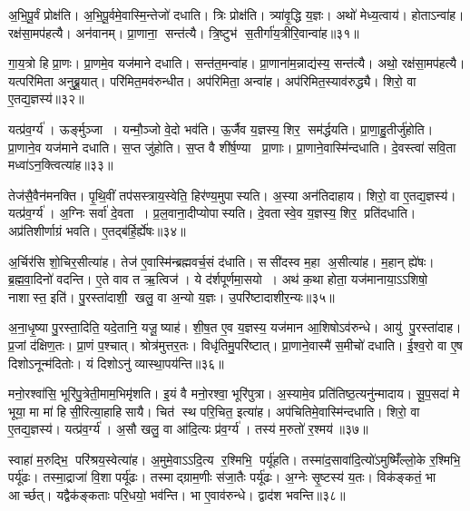 अ॒भि॒पू॒र्वं प्रोक्ष॑ति। 
अ॒भि॒पू॒र्वमे॒वास्मि॒न्तेजो॑ दधाति। 
त्रिः प्रोक्ष॑ति। 
त्र्या॑वृ॒द्धि य॒ज्ञः। 
अथो॑ मेध्य॒त्वाय॑। 
होताऽन्वा॑ह। 
रक्ष॑सा॒मप॑हत्यै। 
अन॑वानम्। 
प्रा॒णाना॒ सन्त॑त्यै। 
त्रि॒ष्टुभ॑ स॒तीर्गा॑य॒त्रीरि॒वान्वा॑ह॥३१॥

गा॒य॒त्रो हि प्रा॒णः। 
प्रा॒णमे॒व यज॑माने दधाति। 
सन्त॑त॒मन्वा॑ह। 
प्रा॒णाना॑म॒न्नाद्य॑स्य॒ सन्त॑त्यै। 
अथो॒ रक्ष॑सा॒मप॑हत्यै। 
यत्परि॑मिता अनुब्रू॒यात्। 
परि॑मित॒मव॑रुन्धीत। 
अप॑रिमिता॒ अन्वा॑ह। 
अप॑रिमित॒स्याव॑रुद्ध्यै। 
शिरो॒ वा ए॒तद्य॒ज्ञस्य॑॥३२॥

यत्प्र॑व॒र्ग्य॑। 
ऊर्ङ्मुञ्जा। 
यन्मौ॒ञ्जो वे॒दो भव॑ति। 
ऊ॒र्जैव य॒ज्ञस्य॒ शिर॒ सम॑र्द्धयति। 
प्रा॒णा॒हु॒तीर्जु॑होति। 
प्रा॒णाने॒व यज॑माने दधाति। 
स॒प्त जु॑होति। 
स॒प्त वै शी॑र्\mbox{}ष॒ण्या प्रा॒णाः। 
प्रा॒णाने॒वास्मि॑न्दधाति। 
दे॒वस्त्वा॑ सवि॒ता मध्वा॑ऽन॒क्त्वित्या॑ह॥३३॥

तेज॑सै॒वैन॑मनक्ति। 
पृ॒थि॒वीं तप॑सस्त्राय॒स्वेति॒ हिर॑ण्य॒मुपास्यति। 
अ॒स्या अन॑तिदाहाय। 
शिरो॒ वा ए॒तद्य॒ज्ञस्य॑। 
यत्प्र॑व॒र्ग्य॑। 
अ॒ग्निः सर्वा॑ दे॒वता। 
प्र॒ल॒वाना॒दीप्योपास्यति। 
दे॒वतास्वे॒व य॒ज्ञस्य॒ शिर॒ प्रति॑दधाति। 
अप्र॑तिशीर्णाग्रं भवति। 
ए॒तद्ब॑र्\mbox{}हि॒र्\mbox{}ह्ये॑षः॥३४॥

अ॒र्चिर॑सि शो॒चिर॒सीत्या॑ह। 
तेज॑ ए॒वास्मि॑न्ब्रह्मवर्च॒सं द॑धाति। 
ससी॑दस्व म॒हा अ॒सीत्या॑ह। 
म॒हान् ह्ये॑षः। 
ब्र॒ह्म॒वा॒दिनो॑ वदन्ति। 
ए॒ते वाव त ऋ॒त्विज॑। 
ये द॑र्\mbox{}शपूर्णमा॒सयो। 
अथ॑ क॒था होता॒ यज॑मानाया॒ऽऽशिषो॒ नाशास्त॒ इति॑। 
पु॒रस्ता॑दाशी॒ खलु॒ वा अ॒न्यो य॒ज्ञः। 
उ॒परि॑ष्टादाशीर॒न्यः॥३५॥

अ॒ना॒धृ॒ष्या पु॒रस्ता॒दिति॒ यदे॒तानि॒ यजू॒ष्याह॑। 
शी॒\ar{}\mbox{}ष॒त ए॒व य॒ज्ञस्य॒ यज॑मान आ॒शिषोऽव॑रुन्धे। 
आयु॑ पु॒रस्ता॑दाह। 
प्र॒जां द॑क्षिण॒तः। 
प्रा॒णं प॒श्चात्। 
श्रोत्र॑मुत्तर॒तः। 
विधृ॑तिमु॒परि॑ष्टात्। 
प्रा॒णाने॒वास्मै॑ स॒मीचो॑ दधाति। 
ई॒श्व॒रो वा ए॒ष दिशोऽनून्म॑दितोः। 
यं दिशोऽनु॑ व्यास्था॒पय॑न्ति॥३६॥

मनो॒रश्वा॑सि॒ भूरि॑पु॒त्रेती॒माम॒भिमृ॑शति। 
इ॒यं वै मनो॒रश्वा॒ भूरि॑पुत्रा। 
अ॒स्यामे॒व प्रति॑तिष्ठ॒त्यनु॑न्मादाय। 
सू॒प॒सदा॑ मे भूया॒ मा मा॑ हिसी॒रित्या॒हाहिसायै। 
चित॑ स्थ परि॒चित॒ इत्या॑ह। 
अप॑चितिमे॒वास्मि॑न्दधाति। 
शिरो॒ वा ए॒तद्य॒ज्ञस्य॑। 
यत्प्र॑व॒र्ग्य॑। 
अ॒सौ खलु॒ वा आ॑दि॒त्यः प्र॑व॒र्ग्य॑। 
तस्य॑ म॒रुतो॑ र॒श्मय॑॥३७॥

स्वाहा॑ म॒रुद्भि॒ परि॑श्रय॒स्वेत्या॑ह। 
अ॒मुमे॒वाऽऽदि॒त्य र॒श्मिभि॒ पर्यू॑हति। 
तस्मा॑द॒सावा॑दि॒त्यो॑ऽमुष्मिँ॑ल्लो॒के र॒श्मिभि॒ पर्यू॑ढः। 
तस्मा॒द्राजा॑ वि॒शा पर्यू॑ढः। 
तस्माद्ग्राम॒णीः स॑जा॒तैः पर्यू॑ढः। 
अ॒ग्नेः सृ॒ष्टस्य॑ य॒तः। 
विक॑ङ्कतं॒ भा आर्च्छत्। 
यद्वैक॑ङ्कताः परि॒धयो॒ भव॑न्ति। 
भा ए॒वाव॑रुन्धे। 
द्वाद॑श भवन्ति॥३८॥

